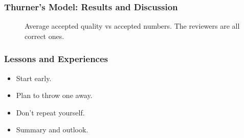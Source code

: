 \documentclass{beamer}
\begin{document}
\begin{frame}
\frametitle{Thurner's Model: Results and Discussion}
\begin{figure}
    \begin{center}
    \caption{Average accepted quality vs accepted numbers. The reviewers are all correct ones.}
    \end{center}
\end{figure}
\end{frame}

\begin{frame}
\frametitle{Lessons and Experiences}
\begin{itemize}
  \item<1-> \large{Start early.}
  \item<2-> \large{Plan to throw one away.}
  \item<3-> \large{Don't repeat yourself.}
  \item<4-> \large{Summary and outlook.}
\end{itemize}
\end{frame}
\end{document}
